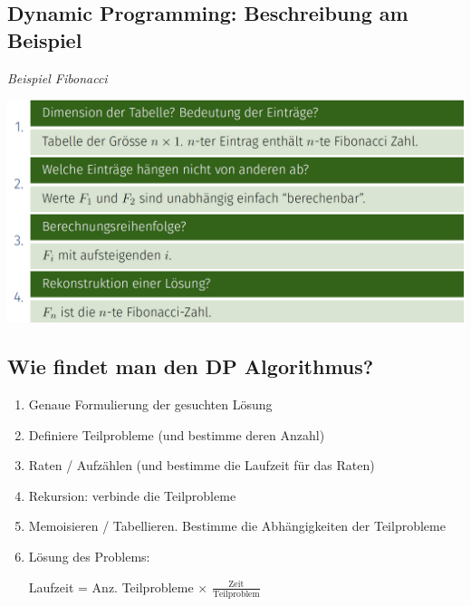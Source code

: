 \begin{sectionbox}
\subsection{Dynamic Programming: Beschreibung am Beispiel}\smallskip

\textit{Beispiel Fibonacci}\par
\begin{center}
    \includegraphics[width = \columnwidth]{../img/DPtable.png}
\end{center}\smallskip

\end{sectionbox}

\begin{sectionbox}
\subsection{Wie findet man den DP Algorithmus?}\smallskip
\begin{enumerate}
    \item Genaue Formulierung der gesuchten Lösung
    \item Definiere Teilprobleme (und bestimme deren Anzahl)
    \item Raten / Aufzählen (und bestimme die Laufzeit für das Raten)
    \item Rekursion: verbinde die Teilprobleme
    \item Memoisieren / Tabellieren. Bestimme die Abhängigkeiten der Teilprobleme
    \item Lösung des Problems: \par Laufzeit = Anz. Teilprobleme $\times$ $\frac{\text{Zeit}}{\text{Teilproblem}}$
\end{enumerate}

\end{sectionbox}


